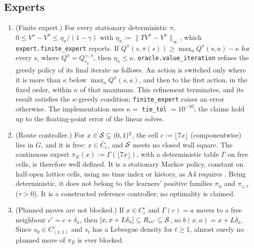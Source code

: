 \subsection{Experts}\label{sec:env-experts}

\begin{proposition}\label{prop:env-experts}
\leavevmode
\begin{enumerate}[nosep,label=(\alph*)]
\item (Finite expert.) For every stationary deterministic $\pi$, $0\le V^\star-V^\pi\le\eta_\pi/(1-\gamma)$ with $\eta_\pi:=\lVert TV^\pi-V^\pi\rVert_\infty$, which \texttt{expert.finite\_expert} reports.
  If $Q^\pi(s,\pi(s))\ge\max_aQ^\pi(s,a)-\kappa$ for every $s$, where $Q^\pi=Q^{+,\pi}_{r_g}$, then $\eta_\pi\le\kappa$.
  \texttt{oracle.value\_iteration} refines the greedy policy of its final iterate as follows.
  An action is switched only where it is more than $\kappa$ below $\max_aQ^\pi(s,a)$, and then to the first action, in the fixed order, within $\kappa$ of that maximum.
  This refinement terminates, and its result satisfies the $\kappa$-greedy condition; \texttt{finite\_expert} raises an error otherwise.
  The implementation uses $\kappa=$ \texttt{tie\_tol} $=10^{-10}$; the claims hold up to the floating-point error of the linear solves.
\item (Route controller.) For $x\in\mathcal{S}\subseteq(0,1)^2$, the cell $c:=\lfloor7x\rfloor$ (componentwise) lies in $G$, and it is free: $x\in\bar C_c$, and $\mathcal{S}$ meets no closed wall square.
  The continuous expert $\pi_E(x):=\Gamma(\lfloor7x\rfloor)$, with a deterministic table $\Gamma$ on free cells, is therefore well defined. It is a stationary Markov policy, constant on half-open lattice cells, using no time index or history, as A4 requires .
  Being deterministic, it does not belong to the learners' positive families $\pi_\phi$ and $\pi_{z,\tau}$ ($\tau>0$). It is a constructed reference controller; no optimality is claimed.
\item (Planned moves are not blocked.) If $x\in C^\circ_c$ and $\Gamma(c)=a$ moves to a free neighbour $c'=c+\delta_a$, then $[x,x+L\delta_a]\subseteq R_{cc'}\subseteq\mathcal{S}$, so $b(x,a)=x+L\delta_a$. Since $s_0\in C^\circ_{(1,1)}$ and $s_t$ has a Lebesgue density for $t\ge1$, almost surely no planned move of $\pi_E$ is ever blocked.
\end{enumerate}
\end{proposition}

